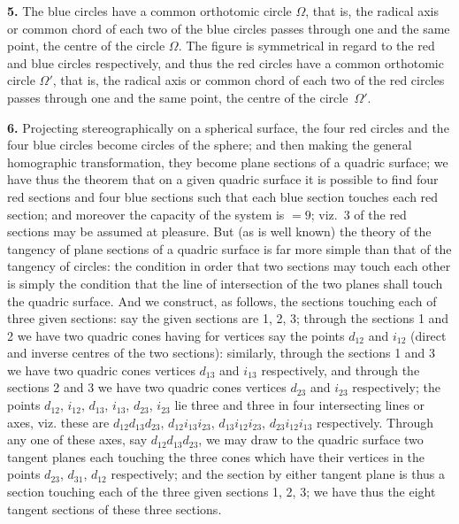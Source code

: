 \documentclass[11pt,a4paper]{book}
\begin{document}
{{{\textbf{5.} The blue circles have a common orthotomic circle $\Omega$, that is, the radical axis or common chord of each two of the blue circles passes through one and the same point, the centre of the circle $\Omega$. The figure is symmetrical in regard to the red and blue circles respectively, and thus the red circles have a common orthotomic circle $\Omega'$, that is, the radical axis or common chord of each two of the red circles passes through one and the same point, the centre of the circle~$\Omega'$.

\textbf{6.} Projecting stereographically on a spherical surface, the four red circles and the four blue circles become circles of the sphere; and then making the general homographic transformation, they become plane sections of a quadric surface; we have thus the theorem that on a given quadric surface it is possible to find four red sections and four blue sections such that each blue section touches each red section; and moreover the capacity of the system is $=9$; viz.~3 of the red sections may be assumed at pleasure. But (as is well known) the theory of the tangency of plane sections of a quadric surface is far more simple than that of the tangency of circles: the condition in order that two sections may touch each other is simply the condition that the line of intersection of the two planes shall touch the quadric surface. And we construct, as follows, the sections touching each of three given sections: say the given sections are 1, 2, 3; through the sections 1 and 2 we have two quadric cones having for vertices say the points $d_{12}$ and $i_{12}$ (direct and inverse centres of the two sections): similarly, through the sections 1 and 3 we have two quadric cones vertices $d_{13}$ and $i_{13}$ respectively, and through the sections 2 and 3 we have two quadric cones vertices $d_{23}$ and $i_{23}$ respectively; the points $d_{12}$, $i_{12}$, $d_{13}$, $i_{13}$, $d_{23}$, $i_{23}$ lie three and three in four intersecting lines or axes, viz. these are $d_{12}d_{13}d_{23}$, $d_{12}i_{13}i_{23}$, $d_{13}i_{12}i_{23}$, $d_{23}i_{12}i_{13}$ respectively. Through any one of these axes, say $d_{12}d_{13}d_{23}$, we may draw to the quadric surface two tangent planes each touching the three cones which have their vertices in the points $d_{23}$, $d_{31}$, $d_{12}$ respectively; and the section by either tangent plane is thus a section touching each of the three given sections 1, 2, 3; we have thus the eight tangent sections of these three sections.

}}}
\end{document}
